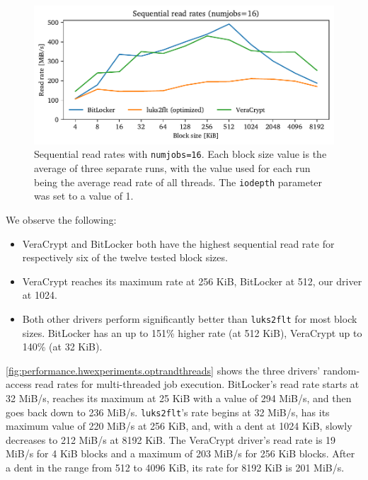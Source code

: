 \begin{figure}[htb!]
	\center
	\includegraphics[scale=1]{../fig/performance.hwexperiments.optseqthreads.pdf}
	\caption[
		Sequential read rates with \texttt{numjobs=16}
	]{
		Sequential read rates with \texttt{numjobs=16}. Each block size value is the average of three separate runs, with the value used for each run being the average read rate of all threads. The \texttt{iodepth} parameter was set to a value of 1.
	}
	\label{fig:performance.hwexperiments.optseqthreads}
\end{figure}

We observe the following:
\begin{itemize}
	\item VeraCrypt and BitLocker both have the highest sequential read rate for respectively six of the twelve tested block sizes.
	\item VeraCrypt reaches its maximum rate at 256 KiB, BitLocker at 512, our driver at 1024.
	\item Both other drivers perform significantly better than \texttt{luks2flt} for most block sizes. BitLocker has an up to 151\% higher rate (at 512 KiB), VeraCrypt up to 140\% (at 32 KiB).
\end{itemize}

\autoref{fig:performance.hwexperiments.optrandthreads} shows the three drivers' random-access read rates for multi-threaded job execution. BitLocker's read rate starts at 32 MiB/s, reaches its maximum at 25 KiB with a value of 294 MiB/s, and then goes back down to 236 MiB/s. \texttt{luks2flt}'s rate begins at 32 MiB/s, has its maximum value of 220 MiB/s at 256 KiB, and, with a dent at 1024 KiB, slowly decreases to 212 MiB/s at 8192 KiB. The VeraCrypt driver's read rate is 19 MiB/s for 4 KiB blocks and a maximum of 203 MiB/s for 256 KiB blocks. After a dent in the range from 512 to 4096 KiB, its rate for 8192 KiB is 201 MiB/s.

